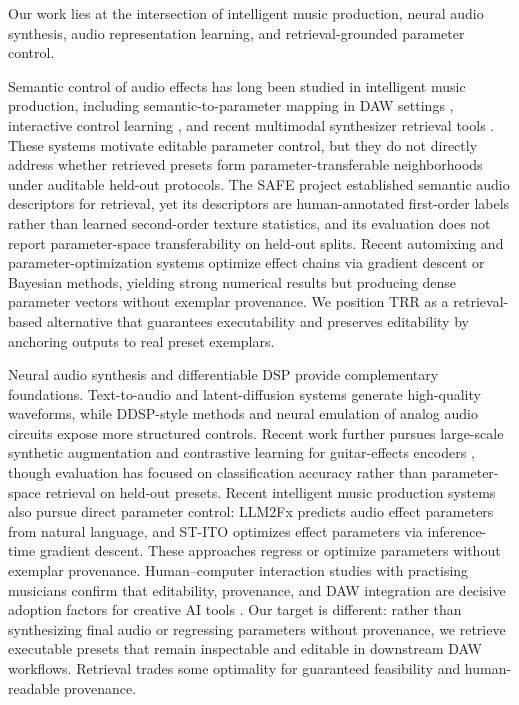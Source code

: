Our work lies at the intersection of intelligent music production, neural audio synthesis, audio representation learning, and retrieval-grounded parameter control.

Semantic control of audio effects has long been studied in intelligent music production, including semantic-to-parameter mapping in DAW settings \citep{stables2014semantic}, interactive control learning \citep{huang2014active}, and recent multimodal synthesizer retrieval tools \citep{bryan2024synthscribe}. These systems motivate editable parameter control, but they do not directly address whether retrieved presets form parameter-transferable neighborhoods under auditable held-out protocols. The SAFE project \citep{stables2014semantic} established semantic audio descriptors for retrieval, yet its descriptors are human-annotated first-order labels rather than learned second-order texture statistics, and its evaluation does not report parameter-space transferability on held-out splits. Recent automixing and parameter-optimization systems \citep{steinmetz2022automix,moliner2025megami,benetos2024stito} optimize effect chains via gradient descent or Bayesian methods, yielding strong numerical results but producing dense parameter vectors without exemplar provenance. We position TRR as a retrieval-based alternative that guarantees executability and preserves editability by anchoring outputs to real preset exemplars.

Neural audio synthesis and differentiable DSP provide complementary foundations. Text-to-audio and latent-diffusion systems \citep{liu2023audioldm,agostinelli2023musiclm,liu2024audioldm2} generate high-quality waveforms, while DDSP-style methods \citep{engel2020ddsp,peladeau2024blind,liu2024ddspSFX} and neural emulation of analog audio circuits \citep{wright2020realtime} expose more structured controls. Recent work further pursues large-scale synthetic augmentation and contrastive learning for guitar-effects encoders \citep{wright2024openamp}, though evaluation has focused on classification accuracy rather than parameter-space retrieval on held-out presets. Recent intelligent music production systems also pursue direct parameter control: LLM2Fx \citep{doh2025llm2fx} predicts audio effect parameters from natural language, and ST-ITO \citep{benetos2024stito} optimizes effect parameters via inference-time gradient descent. These approaches regress or optimize parameters without exemplar provenance. Human--computer interaction studies with practising musicians confirm that editability, provenance, and DAW integration are decisive adoption factors for creative AI tools \citep{fiebrink2009wekinator,krol2025codesign,tchemeube2023mmmc}. Our target is different: rather than synthesizing final audio or regressing parameters without provenance, we retrieve executable presets that remain inspectable and editable in downstream DAW workflows. Retrieval trades some optimality for guaranteed feasibility and human-readable provenance.

